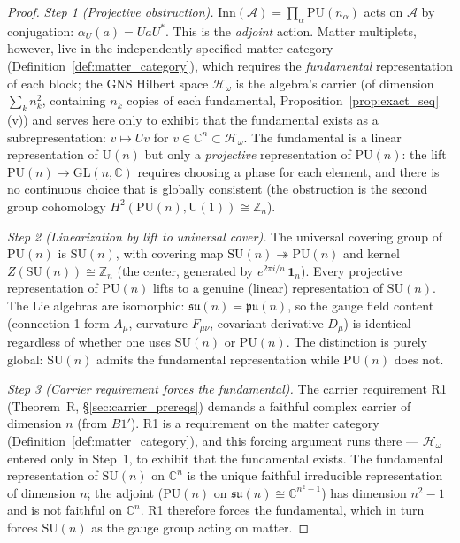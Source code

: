 \documentclass[11pt]{article}
\theoremstyle{definition}
\newcommand{\SU}{\mathrm{SU}}
\begin{document}
\begin{proof}
\textit{Step 1 (Projective obstruction).}\quad
$\mathrm{Inn}(\mathcal{A}) = \prod_\alpha \mathrm{PU}(n_\alpha)$ acts
on $\mathcal{A}$ by conjugation: $\alpha_U(a) = UaU^*$.  This is the
\emph{adjoint} action.  Matter multiplets, however, live in the
independently specified matter category
(Definition~\ref{def:matter_category}), which requires the
\emph{fundamental} representation of each block; the GNS Hilbert space
$\mathcal{H}_\omega$ is the algebra's carrier (of dimension $\sum_k
n_k^2$, containing $n_k$ copies of each fundamental,
Proposition~\ref{prop:exact_seq}(v)) and serves here only to exhibit
that the fundamental exists as a subrepresentation: $v \mapsto Uv$ for
$v \in \mathbb{C}^n \subset \mathcal{H}_\omega$.  The fundamental is a linear representation of
$\mathrm{U}(n)$ but only a \emph{projective} representation of
$\mathrm{PU}(n)$: the lift $\mathrm{PU}(n) \to \mathrm{GL}(n,
\mathbb{C})$ requires choosing a phase for each element, and there is
no continuous choice that is globally consistent (the obstruction is
the second group cohomology $H^2(\mathrm{PU}(n), \mathrm{U}(1))
\cong \mathbb{Z}_n$).

\textit{Step 2 (Linearization by lift to universal cover).}\quad
The universal covering group of $\mathrm{PU}(n)$ is $\SU(n)$, with
covering map $\SU(n) \twoheadrightarrow \mathrm{PU}(n)$ and kernel
$Z(\SU(n)) \cong \mathbb{Z}_n$ (the center, generated by
$e^{2\pi i / n}\,\mathbf{1}_n$).  Every projective representation of
$\mathrm{PU}(n)$ lifts to a genuine (linear) representation of
$\SU(n)$.  The Lie algebras are isomorphic:
$\mathfrak{su}(n) = \mathfrak{pu}(n)$, so the gauge field content
(connection 1-form $A_\mu$, curvature $F_{\mu\nu}$, covariant
derivative $D_\mu$) is identical regardless of whether one uses
$\SU(n)$ or $\mathrm{PU}(n)$.  The distinction is purely global:
$\SU(n)$ admits the fundamental representation while $\mathrm{PU}(n)$
does not.

\textit{Step 3 (Carrier requirement forces the fundamental).}\quad
The carrier requirement R1 (Theorem~R, \S\ref{sec:carrier_prereqs})
demands a faithful complex carrier of dimension $n$ (from $B1'$).
R1 is a requirement on the matter category
(Definition~\ref{def:matter_category}), and this forcing argument runs
there --- $\mathcal{H}_\omega$ entered only in Step~1, to exhibit that
the fundamental exists.  The fundamental representation of $\SU(n)$ on
$\mathbb{C}^n$ is the unique faithful irreducible representation of
dimension $n$; the adjoint ($\mathrm{PU}(n)$ on $\mathfrak{su}(n)
\cong \mathbb{C}^{n^2-1}$) has dimension $n^2 - 1$ and is not faithful
on $\mathbb{C}^n$.  R1 therefore forces the fundamental, which in turn
forces $\SU(n)$ as the gauge group acting on matter.
\end{proof}
\end{document}
